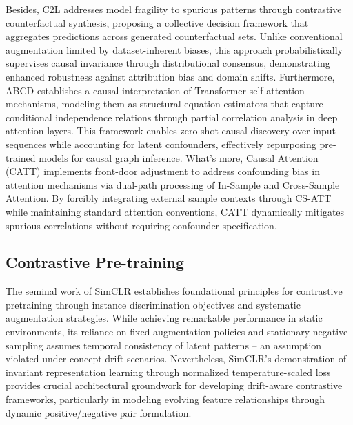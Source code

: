 Besides, C2L \cite{choiC2LCausallyContrastive2022} addresses model fragility to spurious patterns through contrastive counterfactual synthesis, proposing a collective decision framework that aggregates predictions across generated counterfactual sets. Unlike conventional augmentation limited by dataset-inherent biases, this approach probabilistically supervises causal invariance through distributional consensus, demonstrating enhanced robustness against attribution bias and domain shifts. Furthermore, ABCD \cite{rohekarCausalInterpretationSelfAttention2023} establishes a causal interpretation of Transformer self-attention mechanisms, modeling them as structural equation estimators that capture conditional independence relations through partial correlation analysis in deep attention layers. This framework enables zero-shot causal discovery over input sequences while accounting for latent confounders, effectively repurposing pre-trained models for causal graph inference. What’s more, Causal Attention (CATT) \cite{yangCausalAttentionVisionLanguage2021} implements front-door adjustment to address confounding bias in attention mechanisms via dual-path processing of In-Sample and Cross-Sample Attention. By forcibly integrating external sample contexts through CS-ATT while maintaining standard attention conventions, CATT dynamically mitigates spurious correlations without requiring confounder specification. 

\subsection{Contrastive Pre-training}

The seminal work of SimCLR \cite{chenSimpleFrameworkContrastive2020} establishes foundational principles for contrastive pretraining through instance discrimination objectives and systematic augmentation strategies. While achieving remarkable performance in static environments, its reliance on fixed augmentation policies and stationary negative sampling assumes temporal consistency of latent patterns – an assumption violated under concept drift scenarios. Nevertheless, SimCLR's demonstration of invariant representation learning through normalized temperature-scaled loss provides crucial architectural groundwork for developing drift-aware contrastive frameworks, particularly in modeling evolving feature relationships through dynamic positive/negative pair formulation.

